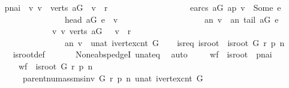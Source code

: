 \begin{isabellebody}
\ \ \isamarkupfalse%
\ {\isacharquery}pnai\ {\isacharequal}\ {\isachardoublequoteopen}{\isacharparenleft}{\isasymforall}v{\isachardot}\ v\ {\isasymin}\ verts\ {\isacharquery}aG\ {\isasymand}\ v\ {\isasymnoteq}\ r\ {\isasymlongrightarrow}\isanewline
\ \ \ \ \ \ \ \ \ \ \ \ \ \ \ \ \ \ {\isacharparenleft}{\isasymexists}e{\isasymin}arcs\ {\isacharquery}aG{\isachardot}\ {\isacharquery}ap\ v\ {\isacharequal}\ Some\ e\ {\isasymand}\ \isanewline
\ \ \ \ \ \ \ \ \ \ \ \ \ \ \ \ \ \ head\ {\isacharquery}aG\ e\ {\isacharequal}\ v\ {\isasymand}\ \isanewline
\ \ \ \ \ \ \ \ \ \ \ \ \ \ \ \ \ \ {\isacharquery}an\ v\ {\isacharequal}\ {\isacharquery}an\ {\isacharparenleft}tail\ {\isacharquery}aG\ e{\isacharparenright}\ {\isacharplus}\ {}{\isacharparenright}{\isacharparenright}\ {\isasymand}\isanewline
\ \ \ \ \ \ \ \ \ \ \ \ \ \ \ {\isacharparenleft}{\isasymforall}v{\isachardot}\ v\ {\isasymin}verts\ {\isacharquery}aG\ {\isasymand}\ \ v\ {\isasymnoteq}\ r\ {\isasymlongrightarrow}\ \isanewline
\ \ \ \ \ \ \ \ \ \ \ \ \ \ \ \ \ \ {\isacharquery}an\ v\ {\isacharless}\ unat\ {\isacharparenleft}ivertex{\isacharunderscore}cnt\ G{\isacharparenright}{\isacharparenright}{\isachardoublequoteclose}\isanewline
\ \ \isamarkupfalse%
\ isr{\isacharunderscore}eq{\isacharcolon}\ {\isachardoublequoteopen}{\isacharquery}is{\isacharunderscore}root\ {\isacharequal}\ is{\isacharunderscore}root\ G\ r\ p\ n{\isachardoublequoteclose}\ \isanewline
\ \ \ \ \isamarkupfalse%
\ is{\isacharunderscore}root{\isacharunderscore}def\ \isanewline
\ \ \ \ \isamarkupfalse%
\ None{\isacharunderscore}abs{\isacharunderscore}pedgeI\ unat{\isacharunderscore}eq{\isacharunderscore}{}\ \isamarkupfalse%
\ auto\ \isanewline
{}\isamarkupfalse%
\isanewline
\ \ \isamarkupfalse%
\ {\isachardoublequoteopen}{\isacharparenleft}{\isacharquery}wf\ {\isasymand}\ {\isacharquery}is{\isacharunderscore}root\ {\isasymand}\ {\isacharquery}pnai{\isacharparenright}\isanewline
\ \ \ \ \ \ {\isacharequal}\ {\isacharparenleft}{\isacharquery}wf\ {\isasymand}\ is{\isacharunderscore}root\ G\ r\ p\ n\ {\isasymand}\ \isanewline
\ \ \ \ \ \ \ \ parent{\isacharunderscore}num{\isacharunderscore}assms{\isacharunderscore}inv\ G\ r\ p\ n\ {\isacharparenleft}unat\ {\isacharparenleft}ivertex{\isacharunderscore}cnt\ G{\isacharparenright}{\isacharparenright}{\isacharparenright}{\isachardoublequoteclose}\isanewline
\ \ \isamarkupfalse%
\ {\isacharminus}\isanewline
\ \ \isacommand{{\isacharbraceleft}}\isamarkupfalse%

\end{isabellebody}
